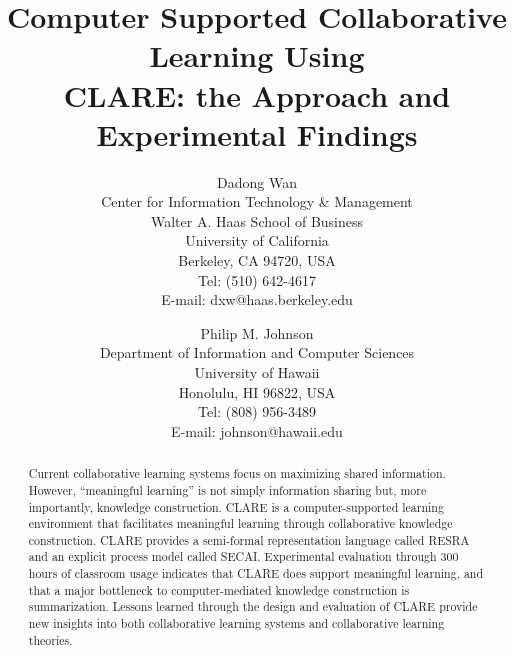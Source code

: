                 


\title {Computer Supported Collaborative Learning Using\\
        CLARE: the Approach and Experimental Findings}
                     
\author{{\authorfont Dadong Wan} \\
Center for Information Technology \& Management\\
Walter A. Haas School of Business\\
University of California\\
Berkeley, CA 94720, USA\\
Tel: (510) 642-4617\\
E-mail: dxw@haas.berkeley.edu
\and
{\authorfont Philip M. Johnson} \\
Department of Information and Computer Sciences\\
University of Hawaii\\
Honolulu, HI 96822, USA\\
Tel: (808) 956-3489\\
E-mail: johnson@hawaii.edu
}
\date{}
\maketitle
                     
\begin{abstract}
  Current collaborative learning systems focus on maximizing shared
  information. However, ``meaningful learning'' is not simply information
  sharing but, more importantly, knowledge construction.  CLARE is a
  computer-supported learning environment that facilitates meaningful
  learning through collaborative knowledge construction. CLARE provides a
  semi-formal representation language called RESRA and an explicit
  process model called SECAI. Experimental evaluation through 300 hours
  of classroom usage indicates that CLARE does support meaningful
  learning, and that a major bottleneck to computer-mediated knowledge
  construction is summarization.  Lessons learned through the design and
  evaluation of CLARE provide new insights into both collaborative
  learning systems and collaborative learning theories.
\end{abstract}
\copyrightspace

